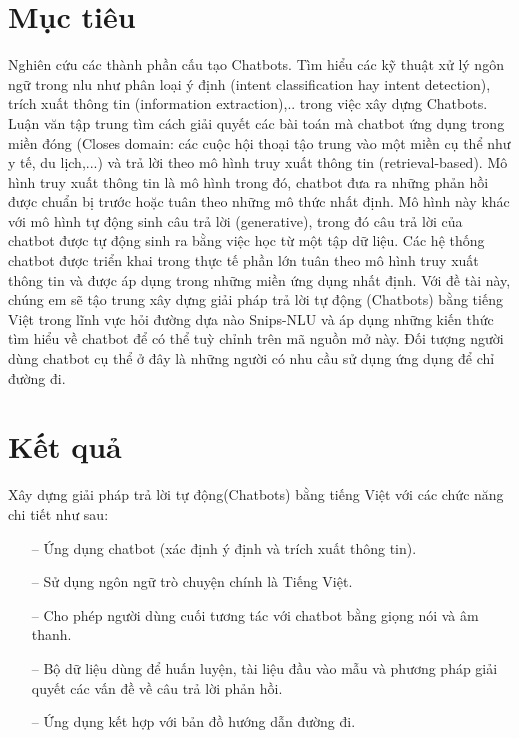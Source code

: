 \section{Mục tiêu}
Nghiên cứu các thành phần cấu tạo Chatbots. Tìm hiểu các kỹ thuật xử lý ngôn ngữ trong \ac{nlu} như phân loại ý định (intent classification hay intent detection), trích xuất thông tin (information extraction),.. trong việc xây dựng Chatbots.
Luận văn tập trung tìm cách giải quyết các bài toán mà chatbot ứng dụng trong miền đóng (Closes domain: các cuộc hội thoại tậo trung vào một miền cụ thể như y tế, du lịch,...) và trả lời theo mô hình truy xuất thông tin (retrieval-based). Mô hình truy xuất thông tin là mô hình trong đó, chatbot đưa ra những phản hồi được chuẩn bị trước hoặc tuân theo những mô thức nhất định. Mô hình này khác với mô hình tự động sinh câu trả lời (generative), trong đó câu trả lời của chatbot được tự động sinh ra bằng việc học từ một tập dữ liệu. Các hệ thống chatbot được triển khai trong thực tế phần lớn tuân theo mô hình truy xuất thông tin và được áp dụng trong những miền ứng dụng nhất định.
Với đề tài này, chúng em sẽ tậo trung xây dựng giải pháp trả lời tự động (Chatbots) bằng tiếng Việt trong lĩnh vực hỏi đường dựa nào Snips-NLU và áp dụng những kiến thức tìm hiểu về chatbot để có thể tuỳ chỉnh trên mã nguồn mở này. Đối tượng người dùng chatbot cụ thể ở đây là những người có nhu cầu sử dụng ứng dụng để chỉ đường đi. 

\section{Kết quả}
Xây dựng giải pháp trả lời tự động(Chatbots) bằng tiếng Việt với các chức năng chi tiết như sau:
\begin{itemize}
    \item[--] Ứng dụng chatbot (xác định ý định và trích xuất thông tin).
    \item[--] Sử dụng ngôn ngữ trò chuyện chính là Tiếng Việt.
    \item[--] Cho phép người dùng cuối tương tác với chatbot bằng giọng nói và âm thanh.
    \item[--] Bộ dữ liệu dùng để huấn luyện, tài liệu đầu vào mẫu và phương pháp giải quyết các vấn đề về câu trả lời phản hồi.
    \item[--] Ứng dụng kết hợp với bản đồ hướng dẫn đường đi.
\end{itemize}



